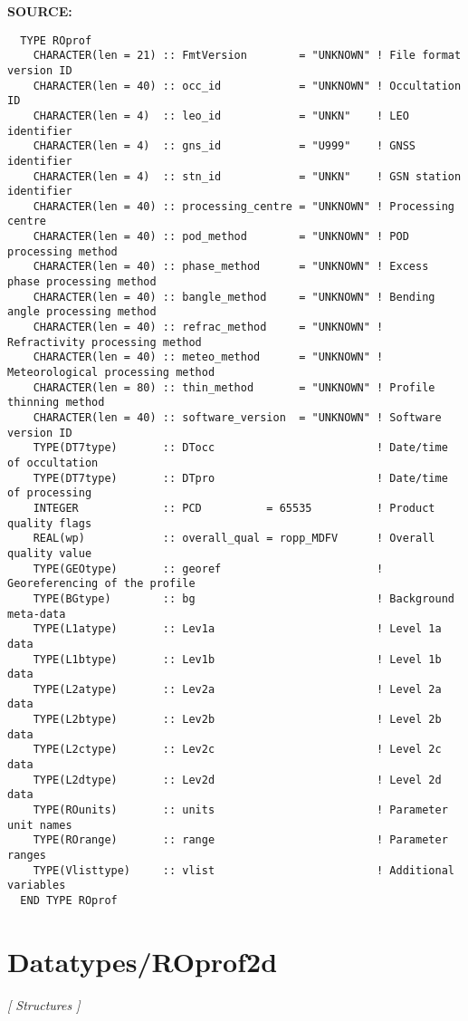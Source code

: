 \textbf{SOURCE:}\hspace{0.08in}\begin{Verbatim}
  TYPE ROprof
    CHARACTER(len = 21) :: FmtVersion        = "UNKNOWN" ! File format version ID
    CHARACTER(len = 40) :: occ_id            = "UNKNOWN" ! Occultation ID
    CHARACTER(len = 4)  :: leo_id            = "UNKN"    ! LEO identifier
    CHARACTER(len = 4)  :: gns_id            = "U999"    ! GNSS identifier
    CHARACTER(len = 4)  :: stn_id            = "UNKN"    ! GSN station identifier
    CHARACTER(len = 40) :: processing_centre = "UNKNOWN" ! Processing centre
    CHARACTER(len = 40) :: pod_method        = "UNKNOWN" ! POD processing method
    CHARACTER(len = 40) :: phase_method      = "UNKNOWN" ! Excess phase processing method
    CHARACTER(len = 40) :: bangle_method     = "UNKNOWN" ! Bending angle processing method
    CHARACTER(len = 40) :: refrac_method     = "UNKNOWN" ! Refractivity processing method
    CHARACTER(len = 40) :: meteo_method      = "UNKNOWN" ! Meteorological processing method
    CHARACTER(len = 80) :: thin_method       = "UNKNOWN" ! Profile thinning method
    CHARACTER(len = 40) :: software_version  = "UNKNOWN" ! Software version ID
    TYPE(DT7type)       :: DTocc                         ! Date/time of occultation
    TYPE(DT7type)       :: DTpro                         ! Date/time of processing
    INTEGER             :: PCD          = 65535          ! Product quality flags
    REAL(wp)            :: overall_qual = ropp_MDFV      ! Overall quality value
    TYPE(GEOtype)       :: georef                        ! Georeferencing of the profile
    TYPE(BGtype)        :: bg                            ! Background meta-data
    TYPE(L1atype)       :: Lev1a                         ! Level 1a data
    TYPE(L1btype)       :: Lev1b                         ! Level 1b data
    TYPE(L2atype)       :: Lev2a                         ! Level 2a data
    TYPE(L2btype)       :: Lev2b                         ! Level 2b data
    TYPE(L2ctype)       :: Lev2c                         ! Level 2c data
    TYPE(L2dtype)       :: Lev2d                         ! Level 2d data
    TYPE(ROunits)       :: units                         ! Parameter unit names
    TYPE(ROrange)       :: range                         ! Parameter ranges
    TYPE(Vlisttype)     :: vlist                         ! Additional variables
  END TYPE ROprof
\end{Verbatim}
\section{Datatypes/ROprof2d}
\textsl{[ Structures ]}

